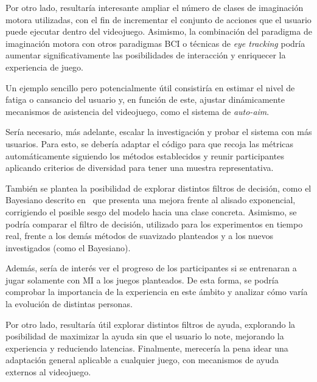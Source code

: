 Por otro lado, resultaría interesante ampliar el número de clases de
imaginación motora utilizadas, con el fin de incrementar el conjunto de
acciones que el usuario puede ejecutar dentro del videojuego. Asimismo, la
combinación del paradigma de imaginación motora con otros paradigmas BCI o
técnicas de \textit{eye tracking} podría aumentar significativamente las posibilidades
de interacción y enriquecer la experiencia de juego.

Un ejemplo sencillo pero potencialmente útil consistiría en estimar el nivel de
fatiga o cansancio del usuario y, en función de este, ajustar dinámicamente
mecanismos de asistencia del videojuego, como el sistema de \textit{auto-aim}.

Sería necesario, más adelante, escalar la investigación y probar el sistema con
más usuarios. Para esto, se debería adaptar el código para que recoja las
métricas automáticamente siguiendo los métodos establecidos y reunir
participantes aplicando criterios de diversidad para tener una muestra
representativa.

También se plantea la posibilidad de explorar distintos filtros de decisión,
como el Bayesiano descrito en~\cite{perdikis2011evidence} que presenta una
mejora frente al alisado exponencial, corrigiendo el posible sesgo del modelo
hacia una clase concreta. Asimismo, se podría comparar el filtro de decisión,
utilizado para los experimentos en tiempo real, frente a los demás métodos de
suavizado planteados y a los nuevos investigados (como el Bayesiano).

Además, sería de interés ver el progreso de los participantes si se entrenaran
a jugar solamente con MI a los juegos planteados. De esta forma, se podría
comprobar la importancia de la experiencia en este ámbito y analizar cómo varía
la evolución de distintas personas.

Por otro lado, resultaría útil explorar distintos filtros de ayuda, explorando
la posibilidad de maximizar la ayuda sin que el usuario lo note, mejorando la
experiencia y reduciendo latencias. Finalmente, merecería la pena idear una
adaptación general aplicable a cualquier juego, con mecanismos de ayuda
externos al videojuego.